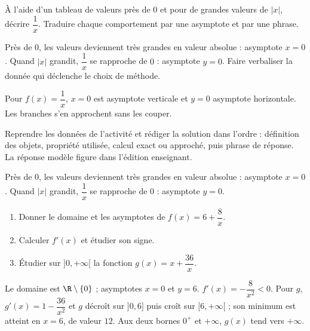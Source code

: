 \begin{activity}
À l'aide d'un tableau de valeurs près de $0$ et pour de grandes valeurs de $|x|$, décrire $\dfrac1x$. Traduire chaque comportement par une asymptote et par une phrase.
\begin{center}\end{center}
\end{activity}
\begin{solution}Près de $0$, les valeurs deviennent très grandes en valeur absolue : asymptote $x=0$. Quand $|x|$ grandit, $\dfrac1x$ se rapproche de $0$ : asymptote $y=0$. Faire verbaliser la donnée qui déclenche le choix de méthode.\end{solution}

\begin{summary}Pour $f(x)=\dfrac1x$, $x=0$ est asymptote verticale et $y=0$ asymptote horizontale. Les branches s'en approchent sans les couper.\end{summary}

\begin{example}
Reprendre les données de l'activité et rédiger la solution dans l'ordre : définition des objets, propriété utilisée, calcul exact ou approché, puis phrase de réponse. La réponse modèle figure dans l'édition enseignant.
\end{example}
\begin{solution}Près de $0$, les valeurs deviennent très grandes en valeur absolue : asymptote $x=0$. Quand $|x|$ grandit, $\dfrac1x$ se rapproche de $0$ : asymptote $y=0$.\end{solution}

\begin{exercise}[essentiel]
\begin{enumerate}\item Donner le domaine et les asymptotes de $f(x)=6+\dfrac{8}x$.\item Calculer $f'(x)$ et étudier son signe.\item Étudier sur $]0,+\infty[$ la fonction $g(x)=x+\dfrac{36}x$.\end{enumerate}
\end{exercise}
\begin{solution}Le domaine est $\R\setminus\{0\}$ ; asymptotes $x=0$ et $y=6$. $f'(x)=-\dfrac{8}{x^2}<0$. Pour $g$, $g'(x)=1-\dfrac{36}{x^2}$ et $g$ décroît sur $]0,6]$ puis croît sur $[6,+\infty[$ ; son minimum est atteint en $x=6$, de valeur $12$. Aux deux bornes $0^+$ et $+\infty$, $g(x)$ tend vers $+\infty$.\end{solution}

